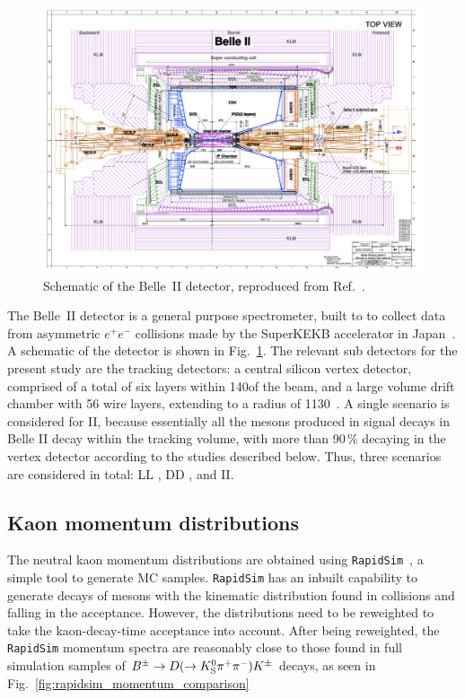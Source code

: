 \begin{figure}[tb]
  \centering
  \includegraphics[width=0.8\columnwidth]{figures/ks_chapter/belledetector.png}
  \caption{Schematic of the Belle~II detector, reproduced from Ref.~\cite{kouBelleIIPhysics2019}.}
  \label{fig:belleII_detector}
\end{figure}

The Belle~II detector is a general purpose spectrometer, built to to collect data from asymmetric $e^+e^-$ collisions made by the SuperKEKB accelerator in Japan~\cite{}. A schematic of the detector is shown in Fig.~\ref{fig:belleII_detector}. The relevant sub detectors for the present study are the tracking detectors: a central silicon vertex detector, comprised of a total of six layers within 140\mm of the beam, and a large volume drift chamber with 56 wire layers, extending to a radius of 1130\mm~\cite{kouBelleIIPhysics2019}. 
A single scenario is considered for \belle II, because essentially all the \KS mesons produced in signal decays in Belle II decay within the tracking volume, with more than 90\,\% decaying in the vertex detector according to the studies described below. Thus, three scenarios are considered in total: LL \lhcb, DD \lhcb, and \belle II.


\subsection{Kaon momentum distributions} %
\label{sub:kaon_momentum_distributions}

The neutral kaon momentum distributions are obtained using \texttt{RapidSim}~\cite{cowanRapidSimApplicationFast2017}, a simple tool to generate MC samples. \texttt{RapidSim} has an inbuilt capability to generate decays of \B mesons with the kinematic distribution found in \lhcb collisions and falling in the \lhcb acceptance. However, the distributions need to be reweighted to take the kaon-decay-time acceptance into account. After being reweighted, the \texttt{RapidSim} momentum spectra are reasonably close to those found in full \lhcb simulation samples of ${{B}^\pm}\rightarrow{\ensuremath{D}}(\rightarrow{\ensuremath{{K}^0_{\mathrm{S}}}}{\ensuremath{{\pi}^+}}{\ensuremath{{\pi}^-}}){{K}^\pm}$ decays, as seen in Fig.~\ref{fig:rapidsim_momentum_comparison}


